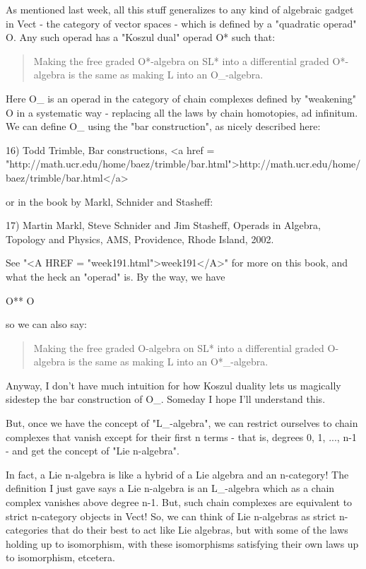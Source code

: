 As mentioned last week, all this stuff generalizes to any kind of
algebraic gadget in Vect - the category of vector spaces - which is
defined by a "quadratic operad" O.  Any such operad has a
"Koszul dual" operad O* such that:

\begin{quote}
 Making the free graded O*-algebra on SL* into a differential
 graded O*-algebra is the same as making L into an O_{\infty }-algebra.
\end{quote}

Here O_{\infty } is an operad in the category of chain complexes
defined by "weakening" O in a systematic way - replacing all the
laws by chain homotopies, ad infinitum.  We can define O_{\infty }
using the "bar construction", as nicely described here:

16) Todd Trimble, Bar constructions,
<a href = "http://math.ucr.edu/home/baez/trimble/bar.html">http://math.ucr.edu/home/baez/trimble/bar.html</a>

or in the book by Markl, Schnider and Stasheff:

17) Martin Markl, Steve Schnider and Jim Stasheff, Operads in 
Algebra, Topology and Physics, AMS, Providence, Rhode Island, 2002.

See "<A HREF = "week191.html">week191</A>" for more on this
book, and what the heck an "operad" is.  By the way, we have

O** \cong  O

so we can also say:

\begin{quote}
 Making the free graded O-algebra on SL* into a differential
 graded O-algebra is the same as making L into an O*_{\infty }-algebra.
\end{quote}



Anyway, I don't have much intuition for how Koszul duality lets
us magically sidestep the bar construction of O_{\infty }. Someday
I hope I'll understand this.

But, once we have the concept of "L_{\infty }-algebra", 
we can restrict ourselves to chain complexes that
vanish except for their first n terms - that is, degrees 0, 1, ...,
n-1 - and get the concept of "Lie n-algebra".

In fact, a Lie n-algebra is like a hybrid of a Lie algebra and an
n-category!  The definition I just gave says a Lie n-algebra is 
an L_{\infty }-algebra which as a chain complex vanishes above 
degree n-1.  But, such chain complexes are equivalent to strict 
n-category objects in Vect!  So, we can think of Lie n-algebras as 
strict n-categories that do their best to act like Lie algebras, but 
with some of the laws holding up to isomorphism, with these isomorphisms 
satisfying their own laws up to isomorphism, etcetera.  

